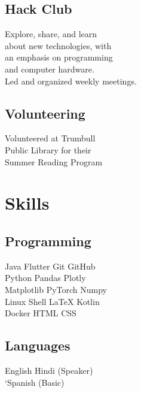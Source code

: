 \documentclass[]{resume-template}
\begin{document}
\begin{minipage}[t]{0.33\textwidth}
        \subsection{Hack Club}\label{subsec:hack-club}
        Explore, share, and learn\\ about
        new technologies, with \\
        an emphasis on programming\\
        and computer hardware.\\ Led and organized weekly meetings.
        \vspace{\topsep}

        \subsection{Volunteering}\label{subsec:volunteering}
        Volunteered at Trumbull \\
        Public Library for their\\
        Summer Reading Program
        \sectionsep{}


        \section{Skills}\label{sec:skills}

        \subsection{Programming}\label{subsec:programming}
        Java \textbullet{} Flutter \textbullet{} Git \textbullet{} GitHub\\
        Python \textbullet{} Pandas \textbullet{} Plotly\\
        Matplotlib \textbullet{} PyTorch \textbullet Numpy\\
        Linux \textbullet{} Shell \textbullet{}  \LaTeX{} \textbullet{} Kotlin\\
        Docker \textbullet{}  HTML \textbullet{}  CSS
        \sectionsep{}

        \subsection{Languages}
        English \textbullet{} Hindi (Speaker)\\
        `Spanish (Basic)



\end{minipage}
\end{document}
